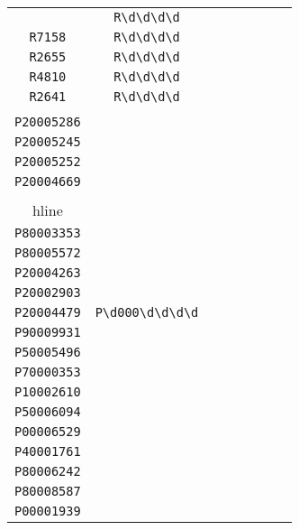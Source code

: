 \begin{longtable}{cccccccc}
\begin{tabular}{ll}
    \verb|R9721| & \verb|R\d\d\d\d|\\
\verb|R7158| & \verb|R\d\d\d\d|\\
\verb|R2655| & \verb|R\d\d\d\d|\\
\verb|R4810| & \verb|R\d\d\d\d|\\
\verb|R2641| & \verb|R\d\d\d\d|
\end{tabular}
\\\midrule 
\begin{tabular}{l}
    \verb|P60004454|\\
\verb|P20005286|\\
\verb|P20005245|\\
\verb|P20005252|\\
\verb|P20004669|\\
\\hline\\
\verb|P80003353|\\
\verb|P80005572|\\
\verb|P20004263|\\
\verb|P20002903|\\
\verb|P20004479|
\end{tabular}

&
\verb|P\d000\d\d\d\d|
&

\begin{tabular}{l}
    \verb|P\d000\d\d\d\d|\\
\verb|P90009931|\\
\verb|P50005496|\\
\verb|P70000353|\\
\verb|P10002610|\\
\verb|P50006094|
\end{tabular}

&

\begin{tabular}{l}
    \verb|P\d000\d\d\d\d|\\
\verb|P00006529|\\
\verb|P40001761|\\
\verb|P80006242|\\
\verb|P80008587|\\
\verb|P00001939|
\end{tabular}

&


\end{longtable}
